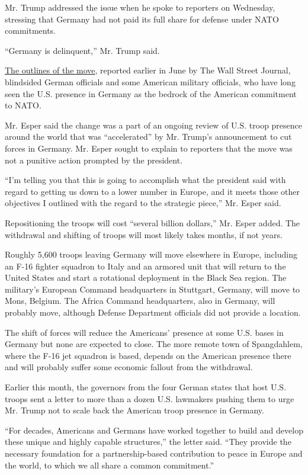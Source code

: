 Mr. Trump addressed the issue when he spoke to reporters on Wednesday,
stressing that Germany had not paid its full share for defense under
NATO commitments.

``Germany is delinquent,'' Mr. Trump said.

\href{https://www.nytimes3xbfgragh.onion/2020/06/05/world/europe/trump-troops-europe-nato-germany.html}{The
outlines of the move}, reported earlier in June by The Wall Street
Journal, blindsided German officials and some American military
officials, who have long seen the U.S. presence in Germany as the
bedrock of the American commitment to NATO.

Mr. Esper said the change was a part of an ongoing review of U.S. troop
presence around the world that was ``accelerated'' by Mr. Trump's
announcement to cut forces in Germany. Mr. Esper sought to explain to
reporters that the move was not a punitive action prompted by the
president.

``I'm telling you that this is going to accomplish what the president
said with regard to getting us down to a lower number in Europe, and it
meets those other objectives I outlined with the regard to the strategic
piece,'' Mr. Esper said.

Repositioning the troops will cost ``several billion dollars,'' Mr.
Esper added. The withdrawal and shifting of troops will most likely
takes months, if not years.

Roughly 5,600 troops leaving Germany will move elsewhere in Europe,
including an F-16 fighter squadron to Italy and an armored unit that
will return to the United States and start a rotational deployment in
the Black Sea region. The military's European Command headquarters in
Stuttgart, Germany, will move to Mons, Belgium. The Africa Command
headquarters, also in Germany, will probably move, although Defense
Department officials did not provide a location.

The shift of forces will reduce the Americans' presence at some U.S.
bases in Germany but none are expected to close. The more remote town of
Spangdahlem, where the F-16 jet squadron is based, depends on the
American presence there and will probably suffer some economic fallout
from the withdrawal.

Earlier this month, the governors from the four German states that host
U.S. troops sent a letter to more than a dozen U.S. lawmakers pushing
them to urge Mr. Trump not to scale back the American troop presence in
Germany.

``For decades, Americans and Germans have worked together to build and
develop these unique and highly capable structures,'' the letter said.
``They provide the necessary foundation for a partnership-based
contribution to peace in Europe and the world, to which we all share a
common commitment.''

